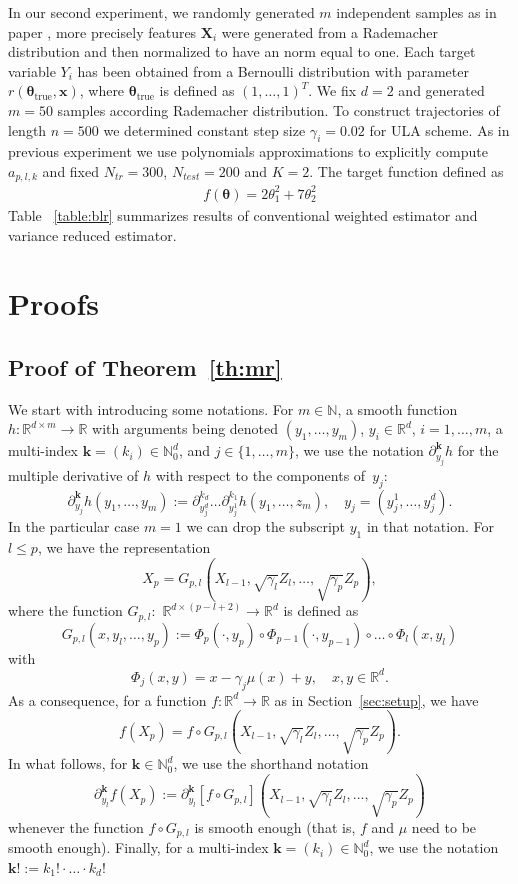 \documentclass[article]{elsarticle}
\begin{document}
In our second experiment, we randomly generated $m$ independent samples as in paper \cite{dalalyan2017theoretical}, more precisely features $\mathbf{X}_i$ were generated from a Rademacher distribution and then normalized to have an norm equal to one. Each target variable $Y_i$ has been obtained from a Bernoulli distribution with parameter $r (\mathbf{\theta}_{\text{true}},\mathbf{x})$, where $\mathbf{\theta}_{\text{true}}$ is defined as $(1, \dots, 1)^T$. We fix $d = 2$ and generated $m = 50$ samples according Rademacher distribution. To construct trajectories of length $n = 500 $ we determined constant step size $\gamma_i = 0.02$ for ULA scheme. As in previous experiment we use polynomials approximations to explicitly compute $a_{p,l,k}$ and fixed $N_{tr} = 300$, $N_{test} = 200$ and $K=2$. The target function defined as
\begin{eqnarray*}
f(\mathbf{\theta}) = 2 \theta_1^2 + 7 \theta_2^2
\end{eqnarray*}
Table ~\ref{table:blr} summarizes results of conventional weighted estimator and variance reduced estimator.



\section{Proofs}
\subsection{Proof of Theorem~\ref{th:mr}}
We start with introducing some notations.
For $m\in\mathbb N$, a smooth function
$h\colon\mathbb R^{d\times m}\to\mathbb R$
with arguments being denoted
$(y_1,\ldots,y_m)$, $y_i\in\mathbb R^d$, $i=1,\ldots,m$,
a multi-index $\mathbf k=(k_i)\in\mathbb N_0^d$,
and $j\in\{1,\ldots,m\}$,
we use the notation $\partial^{\mathbf k}_{y_j} h$ for the multiple derivative of $h$
with respect to the components of~$y_j$:
$$
\partial^{\mathbf k}_{y_j} h(y_1,\ldots,y_m)
:=\partial^{k_d}_{y_j^d}
\ldots
\partial^{k_1}_{y_j^1}
h(y_1,\ldots,z_m),
\quad y_j=(y_j^1,\ldots,y_j^d).
$$
In the particular case $m=1$ we can drop
the subscript $y_1$ in that notation.
For $l\le p$, we have the representation
\[
X_{p}=G_{p,l}(X_{l-1},\sqrt{\gamma_{l}}Z_{l},\ldots,\sqrt{\gamma_{p}}Z_{p}),
\]
where the function \(G_{p,l}:\) \(\mathbb{R}^{d\times(p-l+2)}\to \mathbb{R}^{d}\) is defined as
\[
G_{p,l}(x,y_l,\ldots,y_p):=\Phi_{p}(\cdot,y_{p})\circ\Phi_{p-1}(\cdot,y_{p-1})\circ\ldots\circ\Phi_{l}(x,y_{l})
\]
with
\[
\Phi_{j}(x,y)=x-\gamma_{j}\mu(x)+y,
\quad x,y\in\mathbb R^d.
\]
As a consequence,
for a function $f\colon\mathbb R^d\to\mathbb R$
as in Section~\ref{sec:setup}, we have
$$
f\left(X_{p}\right) =f\circ G_{p,l}(X_{l-1},\sqrt{\gamma_{l}}Z_{l},\ldots,\sqrt{\gamma_{p}}Z_{p}).
$$
In what follows, for $\mathbf{k}\in\mathbb N_0^d$,
we use the shorthand notation
\[
\partial_{y_l}^{\mathbf k} f\left(X_{p}\right)
:=\partial_{y_l}^{\mathbf k} [f\circ G_{p,l}](X_{l-1},\sqrt{\gamma_{l}}Z_{l},\ldots,\sqrt{\gamma_{p}}Z_{p})
\]
whenever the function $f\circ G_{p,l}$ is smooth enough
(that is, $f$ and $\mu$ need to be smooth enough).
Finally, for a multi-index $\mathbf{k}=(k_i)\in\mathbb N_0^d$, we use the notation
\(\mathbf{k} ! :=k_1!\cdot\ldots\cdot k_d !\)
\end{document}
